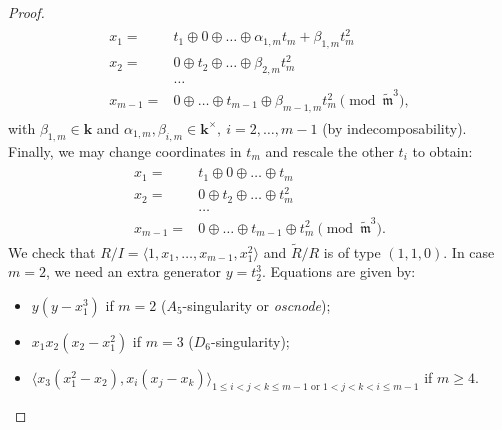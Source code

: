 \documentclass[11pt]{amsart}
\renewcommand{\k}{\mathbf k}
\newcommand{\tR}{\widetilde{R}}
\newcommand{\tm}{\widetilde{\mathfrak m}}
\theoremstyle{plain}
\theoremstyle{definition}
\begin{document}
\begin{proof}
\begin{align}
\begin{split}
  x_1= & t_1\oplus0\oplus\ldots\oplus\alpha_{1,m}t_m+\beta_{1,m}t_m^2\\
  x_2= & 0\oplus t_2\oplus\ldots\oplus\beta_{2,m}t_m^2\\
  &\ldots\\
  x_{m-1}= & 0\oplus\ldots\oplus t_{m-1}\oplus \beta_{m-1,m}t_m^2 \pmod{\tm^3},
 \end{split}
 \end{align}
 with $\beta_{1,m}\in\k$ and $\alpha_{1,m},\beta_{i,m}\in\k^\times,\ i=2,\ldots,m-1$ (by indecomposability). Finally, we may change coordinates in $t_m$ and rescale the other $t_i$ to obtain:
 \begin{align}\label{coordII}
 \begin{split}
  x_1= & t_1\oplus0\oplus\ldots\oplus t_m\\
  x_2= & 0\oplus t_2\oplus\ldots\oplus t_m^2\\
  &\ldots\\
  x_{m-1}= & 0\oplus\ldots\oplus t_{m-1}\oplus t_m^2\pmod{\tm^3}.
 \end{split}
 \end{align}
 We check that $R/I=\langle 1,x_1,\ldots,x_{m-1},x_1^2\rangle$ and $\tR/R$ is of type $(1,1,0)$. In case $m=2$, we need an extra generator $y=t_2^3$. Equations are given by:
 \begin{itemize}
  \item $y(y-x_1^3)$ if $m=2$ ($A_5$-singularity or \emph{oscnode});
  \item $x_1x_2(x_2-x_1^2)$ if $m=3$ ($D_6$-singularity);
  \item $\langle x_3(x_1^2-x_2),x_i(x_j-x_k)\rangle_{1\leq i<j<k\leq m-1 \text{ or }1<j<k<i\leq m-1}$ if $m\geq 4$.
 \end{itemize}

 \smallskip
 

\end{proof}
\end{document}
